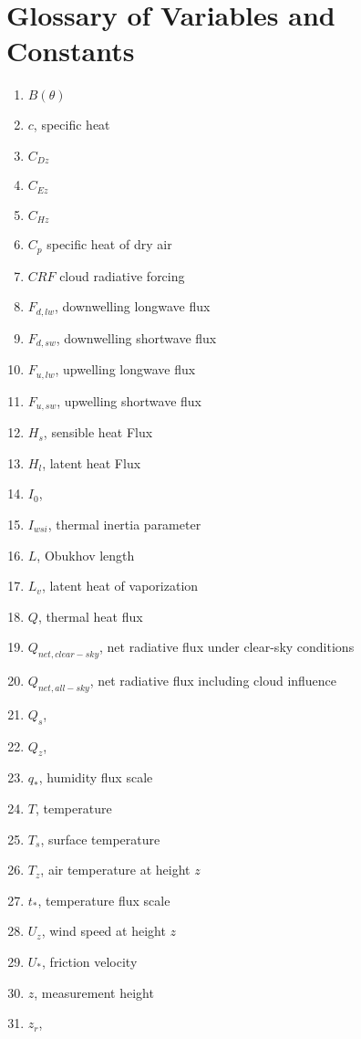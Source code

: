 \chapter{Glossary of Variables and Constants}
\begin{enumerate}
    \item[]$B(\theta)$
    \item[]$c$, specific heat
    \item[]$C_{Dz}$
    \item[]$C_{Ez}$
    \item[]$C_{Hz}$ 
    \item[]$C_{p}$ specific heat of dry air
    \item[]$CRF$ cloud radiative forcing
    \item[]$F_{d,lw}$, downwelling longwave flux
    \item[]$F_{d,sw}$, downwelling shortwave flux
    \item[]$F_{u,lw}$, upwelling longwave flux
    \item[]$F_{u,sw}$, upwelling shortwave flux
    \item[]$H_{s}$, sensible heat Flux
    \item[]$H_{l}$, latent heat Flux
    \item[]$I_{0}$,
    \item[]$I_{wsi}$, thermal inertia parameter
    \item[]$L$, Obukhov length
    \item[]$L_{v}$, latent heat of vaporization
    \item[]$Q$, thermal heat flux
    \item[]$Q_{net, clear-sky}$, net radiative flux under clear-sky conditions
    \item[]$Q_{net, all-sky}$, net radiative flux including cloud influence
    \item[]$Q_{s}$,
    \item[]$Q_{z}$,
    \item[]$q_{*}$, humidity flux scale
    \item[]$T$, temperature
    \item[]$T_{s}$, surface temperature
    \item[]$T_{z}$, air temperature at height $z$
    \item[]$t_{*}$, temperature flux scale
    \item[]$U_{z}$, wind speed at height $z$
    \item[]$U_{*}$, friction velocity
    \item[]$z$, measurement height
    \item[]$z_{r}$,
\end{enumerate}

